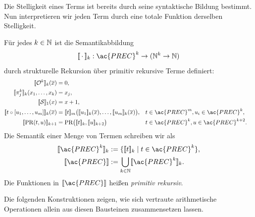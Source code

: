 Die Stelligkeit eines Terms ist bereits durch seine syntaktische Bildung
bestimmt. Nun interpretieren wir jeden Term durch eine totale Funktion derselben
Stelligkeit.
\begin{Def}[name={Semantik der \acs*{PREC}}]\label{def:PREC-Semantik}
	Für jedes $k\in\mathbb{N}$ ist die Semantikabbildung
	\[
		\llbracket\,\cdot\,\rrbracket_k:
		\ac{PREC}^k\to(\N^k\to\N)
	\]
	durch strukturelle Rekursion über primitiv rekursive Terme definiert:
	\begin{align*}
		\llbracket\mathcal{O}^k\rrbracket_k(\overline{x})
			&=0,\\
		\llbracket\pi_j^k\rrbracket_k(x_1,\dots,x_k)
			&=x_j,\\
		\llbracket\mathcal{S}\rrbracket_1(x)
			&=x+1,\\
		\llbracket t\circ[u_1,\dots,u_m]\rrbracket_k(\overline{x})
			&=\llbracket t\rrbracket_m\bigl(
				\llbracket u_1\rrbracket_k(\overline{x}),\dots,
                   \llbracket u_m\rrbracket_k(\overline{x})\bigr),
                   && t \in \ac{PREC}^m, u_i \in \ac{PREC}^k,
          \\
		\llbracket \PR(t,u)\rrbracket_{k+1}
			&=\PR\bigl(\llbracket t\rrbracket_k,
                   \llbracket u\rrbracket_{k+2}\bigr)
                   && t\in\ac{PREC}^k, u\in\ac{PREC}^{k+2}.
	\end{align*}
        Die Semantik einer Menge von Termen schreiben wir als
	\begin{align*}
		\llbracket\ac{PREC}^k\rrbracket_k
			&:=\{\llbracket t\rrbracket_k\mid t\in\ac{PREC}^k\},\\
		\llbracket\ac{PREC}\rrbracket
			&:=\bigcup_{k\in\N}\llbracket\ac{PREC}^k\rrbracket_k.
	\end{align*}
	Die Funktionen in $\llbracket\ac{PREC}\rrbracket$ heißen
	\emph{primitiv rekursiv}.
\end{Def}
Die folgenden Konstruktionen zeigen, wie sich vertraute arithmetische
Operationen allein aus diesen Bausteinen zusammensetzen lassen.

